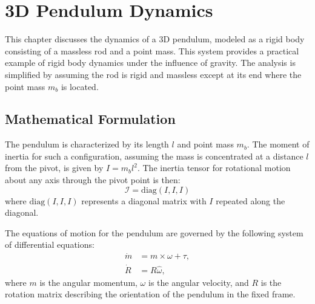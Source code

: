 \chapter{3D Pendulum Dynamics}
\label{chap:Pendulum}

This chapter discusses the dynamics of a 3D pendulum, modeled as a rigid body consisting of a massless rod and a point mass. This system provides a practical example of rigid body dynamics under the influence of gravity. The analysis is simplified by assuming the rod is rigid and massless except at its end where the point mass \(m_b\) is located.

\section{Mathematical Formulation}
The pendulum is characterized by its length \(l\) and point mass \(m_b\). The moment of inertia for such a configuration, assuming the mass is concentrated at a distance \(l\) from the pivot, is given by \(I = m_b l^2\). The inertia tensor for rotational motion about any axis through the pivot point is then:
\[
\mathcal{I} = \text{diag}(I, I, I)
\]
where \(\text{diag}(I, I, I)\) represents a diagonal matrix with \(I\) repeated along the diagonal.

The equations of motion for the pendulum are governed by the following system of differential equations:
\begin{equation}
    \begin{aligned}
        \dot{m} &= m \times \omega + \tau, \\
        \dot{R} &= R \hat{\omega},
    \end{aligned}   
\end{equation}
where \(m\) is the angular momentum, \(\omega\) is the angular velocity, and \(R\) is the rotation matrix describing the orientation of the pendulum in the fixed frame.

